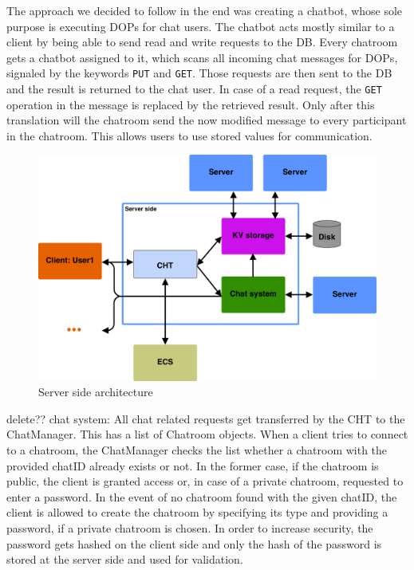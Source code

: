 The approach we decided to follow in the end was creating a chatbot, whose sole purpose is executing DOPs for chat users. The chatbot acts mostly similar to a client by being able to send read and write requests to the DB. Every chatroom gets a chatbot assigned to it, which scans all incoming chat messages for DOPs, signaled by the keywords \texttt{PUT} and \texttt{GET}. Those requests are then sent to the DB and the result is returned to the chat user. In case of a read request, the \texttt{GET} operation in the message is replaced by the retrieved result. Only after this translation will the chatroom send the now modified message to every participant in the chatroom. This allows users to use stored values for communication.

\begin{figure}[h]
	\centering
	\includegraphics[width=\linewidth]{figures/chat/chat_full_arch.png}
	\caption{Server side architecture}
\end{figure}

delete??
chat system:
All chat related requests get transferred by the CHT to the ChatManager. This has a list of Chatroom objects. When a client tries to connect to a chatroom, the ChatManager checks the list whether a chatroom with the provided chatID already exists or not. In the former case, 
if the chatroom is public, the client is granted access or, in case of a private chatroom, requested to enter a password. In the event of no chatroom found with the given chatID, the client is allowed to create the chatroom by specifying its type and providing a password, if a private chatroom is chosen. In order to increase security, the password gets hashed on the client side and only the hash of the password is stored at the server side and used for validation.